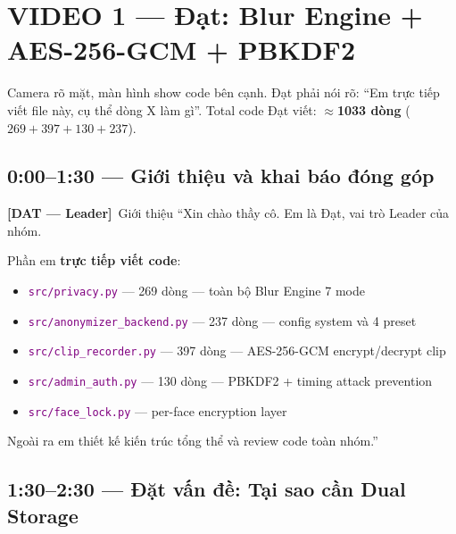 \documentclass[12pt, a4paper]{article}
\newcommand{\dat}{\textcolor{BrickRed}{\textbf{[DAT --- Leader]}}}
\newcommand{\fpath}[1]{\texttt{\textcolor{purple}{#1}}}
\begin{document}
\tableofcontents
\newpage

\section{VIDEO 1 --- Đạt: Blur Engine + AES-256-GCM + PBKDF2}

\begin{tcolorbox}[colback=BrickRed!6, colframe=BrickRed,
  title={\textcolor{white}{\textbf{VIDEO 1 --- DAT (LEADER) --- Blur + Encryption + Auth}}}]
Camera rõ mặt, màn hình show code bên cạnh.
Đạt phải nói rõ: ``Em trực tiếp viết file này, cụ thể dòng X làm gì''.
Total code Đạt viết: $\approx$\textbf{1033 dòng} ($269 + 397 + 130 + 237$).
\end{tcolorbox}

\subsection{0:00--1:30 --- Giới thiệu và khai báo đóng góp}

\begin{dialog}{\dat\ Giới thiệu}
``Xin chào thầy cô. Em là Đạt, vai trò Leader của nhóm.

Phần em \textbf{trực tiếp viết code}:
\begin{itemize}
  \item \fpath{src/privacy.py} --- 269 dòng --- toàn bộ Blur Engine 7 mode
  \item \fpath{src/anonymizer\_backend.py} --- 237 dòng --- config system và 4 preset
  \item \fpath{src/clip\_recorder.py} --- 397 dòng --- AES-256-GCM encrypt/decrypt clip
  \item \fpath{src/admin\_auth.py} --- 130 dòng --- PBKDF2 + timing attack prevention
  \item \fpath{src/face\_lock.py} --- per-face encryption layer
\end{itemize}
Ngoài ra em thiết kế kiến trúc tổng thể và review code toàn nhóm.''
\end{dialog}

\subsection{1:30--2:30 --- Đặt vấn đề: Tại sao cần Dual Storage}
\end{document}
